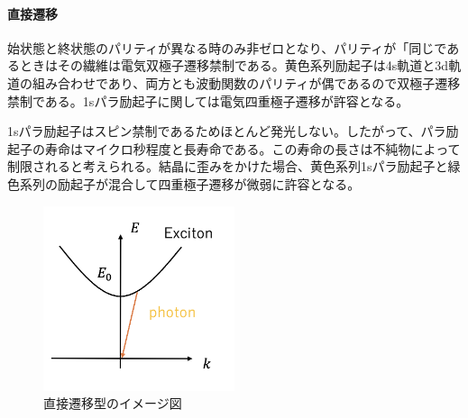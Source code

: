 \paragraph{直接遷移}
始状態と終状態のパリティが異なる時のみ非ゼロとなり、パリティが「同じであるときはその繊維は電気双極子遷移禁制である。黄色系列励起子は4s軌道と3d軌道の組み合わせであり、両方とも波動関数のパリティが偶であるので双極子遷移禁制である。1sパラ励起子に関しては電気四重極子遷移が許容となる。

1sパラ励起子はスピン禁制であるためほとんど発光しない。したがって、パラ励起子の寿命はマイクロ秒程度と長寿命である。この寿命の長さは不純物によって制限されると考えられる。結晶に歪みをかけた場合、黄色系列1sパラ励起子と緑色系列の励起子が混合して四重極子遷移が微弱に許容となる。
\begin{figure}[htbp]
\centering
\includegraphics[width=0.5\textwidth]{Screenshoot_2024-08-18_0.20.28.png}
\caption{直接遷移型のイメージ図}
\label{fig:直接遷移}
\end{figure}

